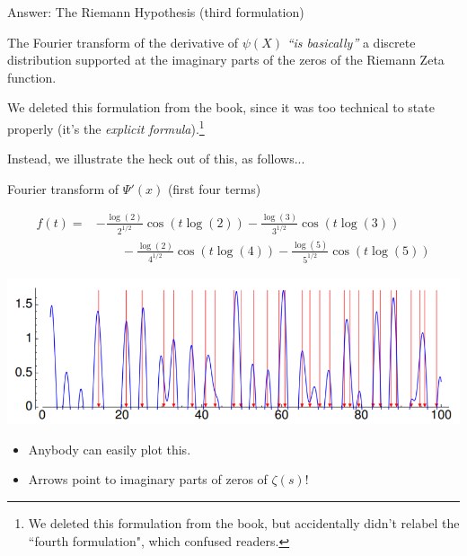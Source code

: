 \documentclass{beamer}
\begin{document}
\begin{frame}{Answer: The Riemann Hypothesis (third formulation)}
  \begin{block}{}
    The Fourier transform
    of the derivative of $\psi(X)$ \emph{``is basically''} 
    a discrete distribution supported at the imaginary parts of the 
    zeros of the Riemann Zeta function.
    
  \end{block}
\vfill

We deleted this formulation from the book, since it was too technical to state properly (it's the {\em explicit formula}).\footnote{We deleted this formulation from the book, but accidentally didn't relabel the ``fourth formulation", which confused readers.}

\vfill

Instead, we illustrate the heck out of this, as follows...

\vfill

\end{frame}

\begin{frame}{Fourier transform of $\Psi'(x)$ (first four terms)}

    \begin{align*}
   f(t) =& -{\frac{\log(2)}{2^{1/2}}}\cos(t\log(2))- {\frac{\log(3)}{3^{1/2}}}\cos(t\log(3))\\
     &\qquad -{\frac{\log(2)}{4^{1/2}}}\cos(t\log(4))-{\frac{\log(5)}{5^{1/2}}}\cos(t\log(5))
  \end{align*}

\includegraphics[height=.42\textheight]{pics/prime-power-freq-5}

\vfill

\begin{itemize}
\item Anybody can easily plot this.  
\item Arrows point to imaginary parts of zeros of $\zeta(s)$!
\end{itemize}

\end{frame}
\end{document}
